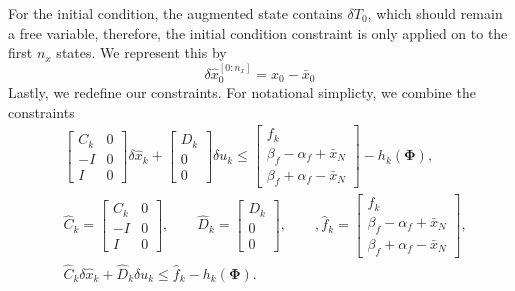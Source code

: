 \documentclass{article}
\begin{document}
For the initial condition, the augmented state contains $\delta T_0$, which should remain a free variable, therefore, the initial condition constraint is only applied on to the first $n_x$ states. We represent this by
\begin{equation}
    \delta \hat x_0^{[0:n_x]} = x_0 - \bar{x}_0
\end{equation}
Lastly, we redefine our constraints. For notational simplicty, we combine the constraints
\begin{equation}
    \begin{aligned}
        & \begin{bmatrix}
                C_k & 0 \\
                -I & 0 \\
                I & 0
            \end{bmatrix} \delta \hat x_k
        + \begin{bmatrix}
            D_k \\
            0 \\
            0
        \end{bmatrix} \delta u_k \leq \begin{bmatrix}
            f_k \\
            \beta_f - \alpha_f + \bar x_N \\
            \beta_f + \alpha_f - \bar x_N
        \end{bmatrix} - h_k(\mathbf{\Phi}), \\
        & \hat{C}_k = \begin{bmatrix}
            C_k & 0 \\
            -I & 0 \\
            I & 0
        \end{bmatrix},
        \qquad
        \hat D_k = \begin{bmatrix}
            D_k \\
            0 \\
            0
        \end{bmatrix},
        \qquad,
        \hat f_k = \begin{bmatrix}
            f_k \\
            \beta_f - \alpha_f + \bar x_N \\
            \beta_f + \alpha_f - \bar x_N
        \end{bmatrix}, \\
        & \hat C_k \delta \hat x_k + \hat D_k \delta u_k \leq \hat f_k - h_k(\mathbf{\Phi}).
    \end{aligned}
\end{equation}
\end{document}
